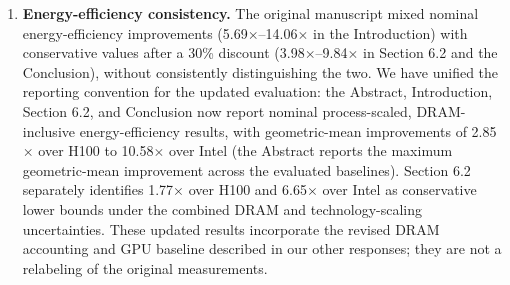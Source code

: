 \begin{enumerate}[label=(\arabic*)]
\item \textbf{Energy-efficiency consistency.} The original manuscript mixed nominal energy-efficiency improvements (5.69$\times$--14.06$\times$ in the Introduction) with conservative values after a 30\% discount (3.98$\times$--9.84$\times$ in Section 6.2 and the Conclusion), without consistently distinguishing the two. We have unified the reporting convention for the updated evaluation: the Abstract, Introduction, Section 6.2, and Conclusion now report nominal process-scaled, DRAM-inclusive energy-efficiency results, with geometric-mean improvements of 2.85$\times$ over H100 to 10.58$\times$ over Intel (the Abstract reports the maximum geometric-mean improvement across the evaluated baselines). Section 6.2 separately identifies 1.77$\times$ over H100 and 6.65$\times$ over Intel as conservative lower bounds under the combined DRAM and technology-scaling uncertainties. These updated results incorporate the revised DRAM accounting and GPU baseline described in our other responses; they are not a relabeling of the original measurements.


\par
\begin{manuscriptexcerpt}
 
\end{manuscriptexcerpt}

\par
\begin{manuscriptexcerpt}
  
\end{manuscriptexcerpt}


\end{enumerate}
